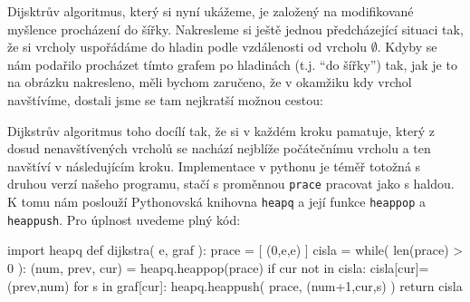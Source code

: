 \documentclass[a4paper,10pt,oneside]{article}
\theoremstyle{definition}
\begin{document}
Dijsktrův algoritmus, který si nyní ukážeme, je založený na modifikované myšlence procházení do šířky. Nakresleme si ještě jednou předcházející
situaci tak, že si vrcholy uspořádáme do hladin podle vzdálenosti od vrcholu $\emptyset$. Kdyby se nám podařilo procházet tímto grafem po hladinách 
(t.j. ``do šířky'') tak, jak je to na obrázku nakresleno, měli bychom zaručeno, že v okamžiku kdy vrchol navštívíme, dostali jsme se tam nejkratší
možnou cestou:

\begin{center}
\end{center}

Dijkstrův algoritmus toho docílí tak, že si v každém kroku pamatuje, který z dosud nenavštívených vrcholů se nachází nejblíže počátečnímu vrcholu
a ten navštíví v následujícím kroku. Implementace v pythonu je téměř totožná s druhou verzí našeho programu, stačí s proměnnou {\tt prace} pracovat
jako s haldou. K tomu nám poslouží Pythonovská knihovna {\tt heapq} a její funkce {\tt heappop} a {\tt heappush}. Pro úplnost uvedeme plný kód:

\begin{python}
 import heapq
 def dijkstra( e, graf ):
    prace = [ (0,e,e) ]
    cisla = {}
    while( len(prace) > 0 ):
        (num, prev, cur) = heapq.heappop(prace)
        if cur not in cisla:
            cisla[cur]=(prev,num)
            for s in graf[cur]:
                heapq.heappush( prace, (num+1,cur,s) )
    return cisla
\end{python}



% 
% 
\end{document}
